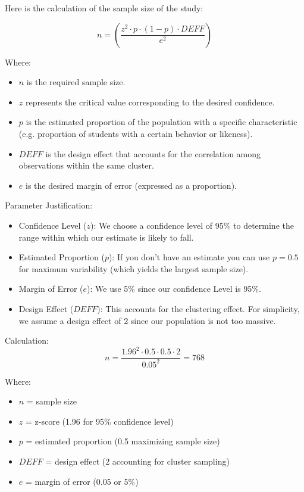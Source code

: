 \documentclass[12pt]{report}
\begin{document}
Here is the calculation of the sample size of the study:

\[
n = \left( \frac{z^2 \cdot p \cdot (1-p) \cdot DEFF}{e^2} \right)
\]

Where:
\begin{itemize}
    \item \( n \) is the required sample size.
    \item \( z \) represents the critical value corresponding to the desired confidence.
    \item \( p \) is the estimated proportion of the population with a specific characteristic (e.g. proportion of students with a certain behavior or likeness).
    \item \( DEFF \) is the design effect that accounts for the correlation among observations within the same cluster.
    \item \( e \) is the desired margin of error (expressed as a proportion).
\end{itemize}

Parameter Justification:
\begin{itemize}
    \item Confidence Level (\( z \)): We choose a confidence level of 95\% to determine the range within which our estimate is likely to fall.
    \item Estimated Proportion (\( p \)): If you don’t have an estimate you can use \( p = 0.5 \) for maximum variability (which yields the largest sample size).
    \item Margin of Error (\( e \)): We use 5\% since our confidence Level is 95\%.
    \item Design Effect (\( DEFF \)): This accounts for the clustering effect. For simplicity, we assume a design effect of 2 since our population is not too massive.
\end{itemize}

Calculation:
\[
n = \frac{1.96^2 \cdot 0.5 \cdot 0.5 \cdot 2}{0.05^2} = 768
\]

Where:
\begin{itemize}
    \item \( n \) = sample size
    \item \( z \) = z-score (1.96 for 95\% confidence level)
    \item \( p \) = estimated proportion (0.5 maximizing sample size)
    \item \( DEFF \) = design effect (2 accounting for cluster sampling)
    \item \( e \) = margin of error (0.05 or 5\%)
\end{itemize}
\end{document}
